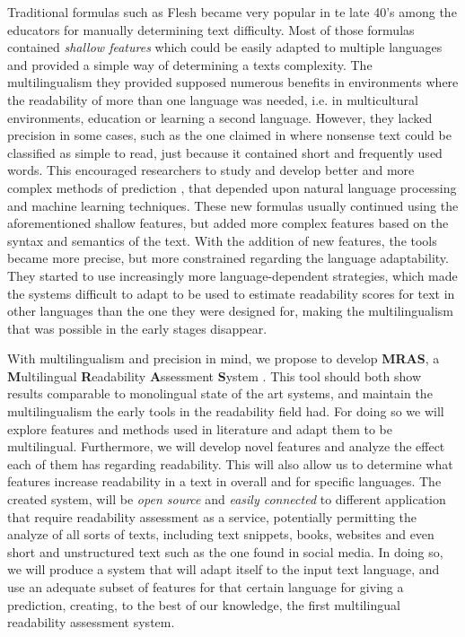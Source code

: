 \documentclass[12pt]{article}
\begin{document}
Traditional formulas such as Flesh \cite{flesch1948new} became very popular in te late 40's among the educators for manually determining text difficulty. Most of those formulas contained \textit{shallow features} which could be easily adapted to multiple languages and provided a simple way of determining a texts complexity. The multilingualism they provided supposed numerous benefits in environments where the readability of more than one language was needed, i.e. in multicultural environments, education or learning a second language. However, they lacked precision in some cases, such as the one claimed in \cite{davison1982failure} where nonsense text could be classified as simple to read, just because it contained short and frequently used words. This encouraged researchers to study and develop better and more complex methods of prediction \cite{franccois2012ai,aluisio2010readability}, that depended upon natural language processing and machine learning techniques. These new formulas usually continued using the aforementioned shallow  features, but added more complex features based on the syntax and semantics of the text. With the addition of new features, the tools became more precise, but more constrained regarding the language adaptability. They started to use increasingly more language-dependent strategies, which made the systems difficult to adapt to be used to estimate readability scores for text in other languages than the one they were designed for, making the multilingualism that was possible in the early stages disappear.  

With multilingualism and precision in mind, we propose to develop \textbf{MRAS}, a \textbf{M}ultilingual \textbf{R}eadability \textbf{A}ssessment \textbf{S}ystem . This tool should both show results comparable to monolingual state of the art systems,  and  maintain the multilingualism the early tools in the readability field had. For doing so we will explore features and methods used in literature and adapt them to be multilingual. Furthermore, we will develop novel features and analyze the effect each of them has regarding readability. This will also allow us to determine what features increase readability in a text in overall and for specific languages. The created system, will be \textit{open source} and \textit{easily connected} to different application that require readability assessment as a service, potentially permitting the analyze of all sorts of texts, including text snippets, books, websites and even short and unstructured text such as the one found in social media. In doing so, we will produce a system that will adapt itself to the input text language, and use an adequate subset of features for that certain language for giving a prediction, creating, to the best of our knowledge, the first multilingual readability assessment system.
\end{document}
